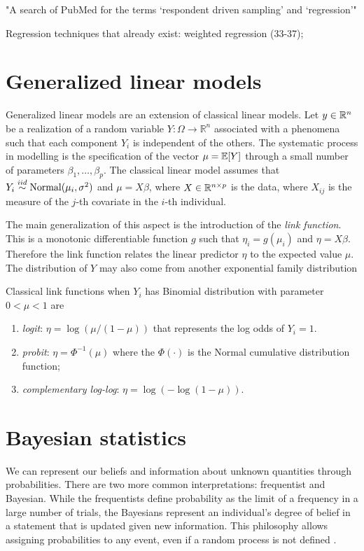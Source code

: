 "A search of PubMed for the terms ‘respondent driven sampling’ and
‘regression’"

Regression techniques that already exist: weighted regression (33-37);

\section{Generalized linear models}
\label{sec:glm}

Generalized linear models are an extension of classical linear models. 
Let $y \in \mathbb{R}^{n}$ be a realization of a random variable 
$Y : \Omega \to \mathbb{R}^n$ associated with a phenomena such that each 
component $Y_i$ is independent of the others. The systematic process in 
modelling is the specification of the vector $\mu = \mathbb{E}[Y]$ through a small 
number of parameters $\beta_1, \dots, \beta_p$. The classical linear model 
assumes that $Y_i \overset{iid}{\sim} \operatorname{Normal}(\mu_i, \sigma^2)$ and $\mu = X\beta$,
where $X \in \mathbb{R}^{n \times p}$ is the data, where $X_{ij}$ is the measure 
of the $j$-th covariate in the $i$-th individual. 

The main generalization of this aspect is the introduction of the 
\textit{link function}. This is a monotonic differentiable function $g$ 
such that $\eta_i = g(\mu_i)$ and $\eta = X\beta$. Therefore the link 
function relates the linear predictor $\eta$ to the expected value $\mu$. 
The distribution of $Y$ 
may also come from another exponential family distribution 

Classical link functions when $Y_i$ has Binomial distribution with 
parameter $0 < \mu < 1$ are 

\begin{enumerate}
  \item \textit{logit}: $\eta = \log(\mu / (1 - \mu))$ that represents 
  the log odds of $Y_i = 1$. 
  \item \textit{probit}: $\eta = \Phi^{-1}(\mu)$ where the $\Phi(\cdot)$ 
  is the Normal cumulative distribution function; 
  \item \textit{complementary log-log}: $\eta = \log(-\log(1 - \mu))$.
\end{enumerate}


\section{Bayesian statistics}
\label{sec:bayesian_statistics}

We can represent our beliefs and information about unknown quantities 
through probabilities. There are two more common interpretations: 
frequentist and Bayesian. While the frequentists define
probability as the limit of a frequency in a large number of trials, the
Bayesians represent an individual's degree of belief in a statement that is
updated given new information. This philosophy allows assigning probabilities
to any event, even if a random process is not defined \cite{statisticat2016laplacesdemon}. 

